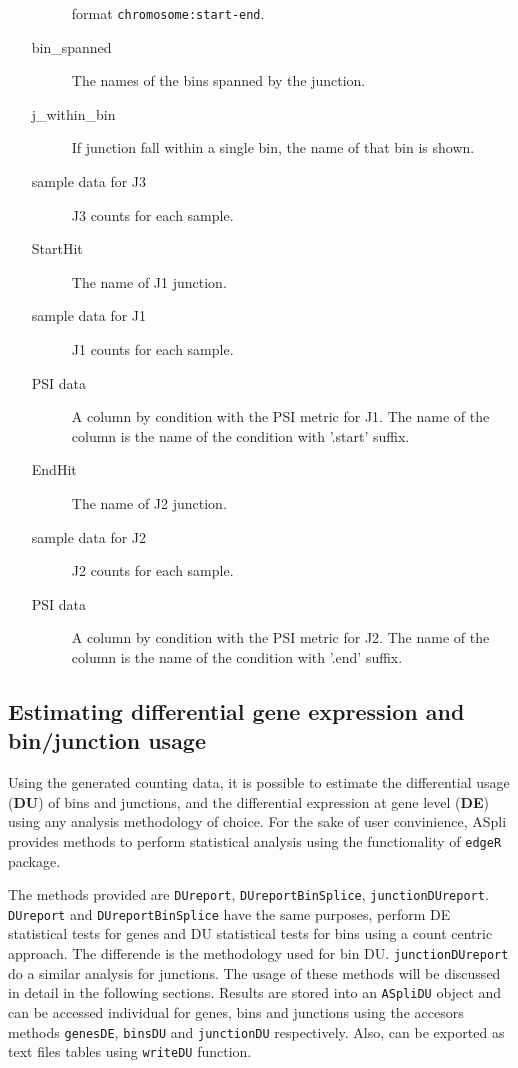 \documentclass{article}
\begin{document}
\begin{itemize}
\begin{description}
      format \texttt{chromosome:start-end}.
      \item[bin\_spanned] The names of the bins spanned by the junction.
      \item[j\_within\_bin] If junction fall within a single bin, the name of
      that bin is shown.
      \item[sample data for J3] J3 counts for each sample.
      \item[StartHit] The name of J1 junction.
      \item[sample data for J1] J1 counts for each sample.
      \item[PSI data] A column by condition with the PSI metric for J1. The name
      of the column is the name of the condition with '.start' suffix.
      \item[EndHit] The name of J2 junction.
      \item[sample data for J2] J2 counts for each sample.
      \item[PSI data] A column by condition with the PSI metric for J2. The name
      of the column is the name of the condition with '.end' suffix.
      \\
    \end{description}  

\end{itemize}

\subsection{Estimating differential gene expression and bin/junction usage}

Using the generated counting data, it is possible to estimate the differential
usage (\textbf{DU}) of bins and junctions, and the differential expression at
gene level (\textbf{DE}) using any analysis methodology of choice. For the sake
of user convinience, ASpli provides methods to perform statistical analysis 
using the functionality of \texttt{edgeR} package.

The methods provided are \texttt{DUreport}, \texttt{DUreportBinSplice},
\texttt{junctionDUreport}. \texttt{DUreport} and \texttt{DUreportBinSplice}
have the same purposes, perform DE statistical tests for genes and DU
statistical tests for bins using a count centric approach.
The differende is the methodology used for bin DU. \texttt{junctionDUreport} do
a similar analysis for junctions. The usage of these methods will be discussed in detail
in the following sections. Results are stored into an \texttt{ASpliDU} object
and can be accessed individual for genes, bins and junctions using the accesors
methods \texttt{genesDE}, \texttt{binsDU} and \texttt{junctionDU}
respectively. Also, can be exported as text files tables using \texttt{writeDU}
function.
\end{document}
